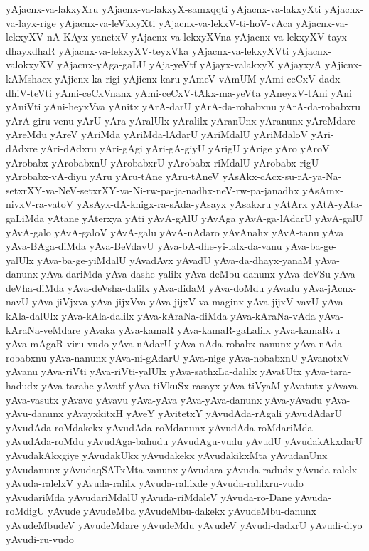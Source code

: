 {yAjacnx-va-lakxyXru
yAjacnx-va-lakxyX-samxqqti
yAjacnx-va-lakxyXti
yAjacnx-va-layx-rige
yAjacnx-va-leVkxyXti
yAjacnx-va-lekxV-ti-hoV-vAca
yAjacnx-va-lekxyXV-nA-KAyx-yanetxV
yAjacnx-va-lekxyXVna
yAjacnx-va-lekxyXV-tayx-dhayxdhaR
yAjacnx-va-lekxyXV-teyxVka
yAjacnx-va-lekxyXVti
yAjacnx-valokxyXV
yAjacnx-yAga-gaLU
yAja-yeVtf
yAjayx-valakxyX
yAjayxyA
yAjicnx-kAMshacx
yAjicnx-ka-rigi
yAjicnx-karu
yAmeV-vAmUM
yAmi-ceCxV-dadx-dhiV-teVti
yAmi-ceCxVnanx
yAmi-ceCxV-tAkx-ma-yeVta
yAneyxV-tAni
yAni
yAniVti
yAni-heyxVva
yAnitx
yArA-darU
yArA-da-robabxnu
yArA-da-robabxru
yArA-giru-venu
yArU
yAra
yAralUlx
yAralilx
yAranUnx
yAranunx
yAreMdare
yAreMdu
yAreV
yAriMda
yAriMda-lAdarU
yAriMdalU
yAriMdaloV
yAri-dAdxre
yAri-dAdxru
yAri-gAgi
yAri-gA-giyU
yArigU
yArige
yAro
yAroV
yArobabx
yArobabxnU
yArobabxrU
yArobabx-riMdalU
yArobabx-rigU
yArobabx-vA-diyu
yAru
yAru-tAne
yAru-tAneV
yAsAkx-cAcx-su-rA-ya-Na-setxrXY-va-NeV-setxrXY-va-Ni-rw-pa-ja-nadhx-neV-rw-pa-janadhx
yAsAmx-nivxV-ra-vatoV
yAsAyx-dA-knigx-ra-sAda-yAsayx
yAsakxru
yAtArx
yAtA-yAta-gaLiMda
yAtane
yAterxya
yAti
yAvA-gAlU
yAvAga
yAvA-ga-lAdarU
yAvA-galU
yAvA-galo
yAvA-galoV
yAvA-galu
yAvA-nAdaro
yAvAnahx
yAvA-tanu
yAva
yAva-BAga-diMda
yAva-BeVdavU
yAva-bA-dhe-yi-lalx-da-vanu
yAva-ba-ge-yalUlx
yAva-ba-ge-yiMdalU
yAvadAvx
yAvadU
yAva-da-dhayx-yanaM
yAva-danunx
yAva-dariMda
yAva-dashe-yalilx
yAva-deMbu-danunx
yAva-deVSu
yAva-deVha-diMda
yAva-deVsha-dalilx
yAva-didaM
yAva-doMdu
yAvadu
yAva-jAcnx-navU
yAva-jiVjxva
yAva-jijxVva
yAva-jijxV-va-maginx
yAva-jijxV-vavU
yAva-kAla-dalUlx
yAva-kAla-dalilx
yAva-kAraNa-diMda
yAva-kAraNa-vAda
yAva-kAraNa-veMdare
yAvaka
yAva-kamaR
yAva-kamaR-gaLalilx
yAva-kamaRvu
yAva-mAgaR-viru-vudo
yAva-nAdarU
yAva-nAda-robabx-nanunx
yAva-nAda-robabxnu
yAva-nanunx
yAva-ni-gAdarU
yAva-nige
yAva-nobabxnU
yAvanotxV
yAvanu
yAva-riVti
yAva-riVti-yalUlx
yAva-sathxLa-dalilx
yAvatUtx
yAva-tara-hadudx
yAva-tarahe
yAvatf
yAva-tiVkuSx-rasayx
yAva-tiVyaM
yAvatutx
yAvava
yAva-vasutx
yAvavo
yAvavu
yAva-yAva
yAva-yAva-danunx
yAva-yAvadu
yAva-yAvu-danunx
yAvayxkitxH
yAveY
yAvitetxY
yAvudAda-rAgali
yAvudAdarU
yAvudAda-roMdakekx
yAvudAda-roMdanunx
yAvudAda-roMdariMda
yAvudAda-roMdu
yAvudAga-bahudu
yAvudAgu-vudu
yAvudU
yAvudakAkxdarU
yAvudakAkxgiye
yAvudakUkx
yAvudakekx
yAvudakikxMta
yAvudanUnx
yAvudanunx
yAvudaqSATxMta-vanunx
yAvudara
yAvuda-radudx
yAvuda-ralelx
yAvuda-ralelxV
yAvuda-ralilx
yAvuda-ralilxde
yAvuda-ralilxru-vudo
yAvudariMda
yAvudariMdalU
yAvuda-riMdaleV
yAvuda-ro-Dane
yAvuda-roMdigU
yAvude
yAvudeMba
yAvudeMbu-dakekx
yAvudeMbu-danunx
yAvudeMbudeV
yAvudeMdare
yAvudeMdu
yAvudeV
yAvudi-dadxrU
yAvudi-diyo
yAvudi-ru-vudo
}
